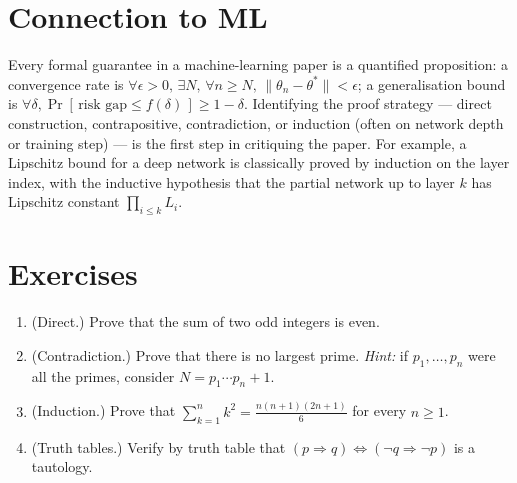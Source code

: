 \documentclass[11pt]{article}
\begin{document}
\section*{Connection to ML}

Every formal guarantee in a machine-learning paper is a quantified proposition:
a convergence rate is $\forall \epsilon > 0,\, \exists N,\, \forall n \geq N,\,
\|\theta_n - \theta^*\| < \epsilon$; a generalisation bound is $\forall \delta,
\Pr[\,\text{risk gap} \leq f(\delta)\,] \geq 1 - \delta$. Identifying the
proof strategy --- direct construction, contrapositive, contradiction, or
induction (often on network depth or training step) --- is the first step in
critiquing the paper. For example, a Lipschitz bound for a deep network is
classically proved by induction on the layer index, with the inductive
hypothesis that the partial network up to layer $k$ has Lipschitz constant
$\prod_{i \leq k} L_i$.

\section*{Exercises}

\begin{enumerate}
  \item (Direct.) Prove that the sum of two odd integers is even.
  \item (Contradiction.) Prove that there is no largest prime. \emph{Hint:} if
        $p_1, \dots, p_n$ were all the primes, consider $N = p_1 \cdots p_n + 1$.
  \item (Induction.) Prove that $\displaystyle \sum_{k=1}^n k^2 = \frac{n(n+1)(2n+1)}{6}$
        for every $n \geq 1$.
  \item (Truth tables.) Verify by truth table that
        $(p \Rightarrow q) \Leftrightarrow (\neg q \Rightarrow \neg p)$
        is a tautology.
\end{enumerate}
\end{document}
